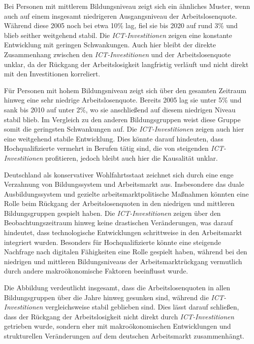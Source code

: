 Bei Personen mit mittlerem Bildungsniveau zeigt sich ein ähnliches Muster, wenn auch 
auf einem insgesamt niedrigeren Ausgangsniveau der Arbeitslosenquote. Während diese 
2005 noch bei etwa 10\% lag, fiel sie bis 2020 auf rund 3\% und blieb seither 
weitgehend stabil. Die \textit{\ac{ICT}-Investitionen} zeigen eine konstante 
Entwicklung mit geringen Schwankungen. Auch hier bleibt der direkte Zusammenhang 
zwischen den \textit{\ac{ICT}-Investitionen} und der Arbeitslosenquote unklar, da 
der Rückgang der Arbeitslosigkeit langfristig verläuft und nicht direkt mit den 
Investitionen korreliert.

Für Personen mit hohem Bildungsniveau zeigt sich über den gesamten Zeitraum hinweg 
eine sehr niedrige Arbeitslosenquote. Bereits 2005 lag sie unter 5\% und sank bis
 2010 auf unter 2\%, wo sie anschließend auf diesem niedrigen Niveau stabil blieb. 
 Im Vergleich zu den anderen Bildungsgruppen weist diese Gruppe somit die geringsten 
 Schwankungen auf. Die \textit{\ac{ICT}-Investitionen} zeigen auch hier eine 
 weitgehend stabile Entwicklung. Dies könnte darauf hindeuten, dass Hochqualifizierte 
 vermehrt in Berufen tätig sind, die von steigenden \textit{\ac{ICT}-Investitionen} 
 profitieren, jedoch bleibt auch hier die Kausalität unklar.

Deutschland als konservativer Wohlfahrtsstaat zeichnet sich durch eine enge Verzahnung 
von Bildungssystem und Arbeitsmarkt aus. Insbesondere das duale Ausbildungssystem 
und gezielte arbeitsmarktpolitische Maßnahmen könnten eine Rolle beim Rückgang der 
Arbeitslosenquoten in den niedrigen und mittleren Bildungsgruppen gespielt haben. 
Die \textit{\ac{ICT}-Investitionen} zeigen über den Beobachtungszeitraum hinweg keine 
drastischen Veränderungen, was darauf hindeutet, dass technologische Entwicklungen 
schrittweise in den Arbeitsmarkt integriert wurden. Besonders für Hochqualifizierte 
könnte eine steigende Nachfrage nach digitalen Fähigkeiten eine Rolle gespielt 
haben, während bei den niedrigen und mittleren Bildungsniveaus der 
Arbeitsmarktrückgang vermutlich durch andere makroökonomische Faktoren beeinflusst 
wurde.

Die Abbildung verdeutlicht insgesamt, dass die Arbeitslosenquoten in allen 
Bildungsgruppen über die Jahre hinweg gesunken sind, während die 
\textit{\ac{ICT}-Investitionen} vergleichsweise stabil geblieben sind. Dies lässt darauf 
schließen, dass der Rückgang der Arbeitslosigkeit nicht direkt durch 
\textit{\ac{ICT}-Investitionen} getrieben wurde, sondern eher mit makroökonomischen 
Entwicklungen und strukturellen Veränderungen auf dem deutschen Arbeitsmarkt 
zusammenhängt.

